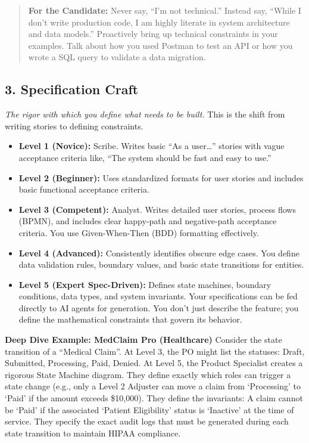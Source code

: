 \begin{quote}
\textbf{For the Candidate:} Never say, ``I'm not technical.'' Instead
say, ``While I don't write production code, I am highly literate in
system architecture and data models.'' Proactively bring up technical
constraints in your examples. Talk about how you used Postman to test an
API or how you wrote a SQL query to validate a data migration.
\end{quote}

\subsection{3. Specification Craft}\label{specification-craft}

\emph{The rigor with which you define what needs to be built.} This is
the shift from writing stories to defining constraints.

\begin{itemize}
\tightlist
\item
  \textbf{Level 1 (Novice):} Scribe. Writes basic ``As a user\ldots{}''
  stories with vague acceptance criteria like, ``The system should be
  fast and easy to use.''
\item
  \textbf{Level 2 (Beginner):} Uses standardized formats for user
  stories and includes basic functional acceptance criteria.
\item
  \textbf{Level 3 (Competent):} Analyst. Writes detailed user stories,
  process flows (BPMN), and includes clear happy-path and negative-path
  acceptance criteria. You use Given-When-Then (BDD) formatting
  effectively.
\item
  \textbf{Level 4 (Advanced):} Consistently identifies obscure edge
  cases. You define data validation rules, boundary values, and basic
  state transitions for entities.
\item
  \textbf{Level 5 (Expert Spec-Driven):} Defines state machines,
  boundary conditions, data types, and system invariants. Your
  specifications can be fed directly to AI agents for generation. You
  don't just describe the feature; you define the mathematical
  constraints that govern its behavior.
\end{itemize}

\textbf{Deep Dive Example: MedClaim Pro (Healthcare)} Consider the state
transition of a ``Medical Claim''. At Level 3, the PO might list the
statuses: Draft, Submitted, Processing, Paid, Denied. At Level 5, the
Product Specialist creates a rigorous State Machine diagram. They define
exactly which roles can trigger a state change (e.g., only a Level 2
Adjuster can move a claim from `Processing' to `Paid' if the amount
exceeds \$10,000). They define the invariants: A claim cannot be `Paid'
if the associated `Patient Eligibility' status is `Inactive' at the time
of service. They specify the exact audit logs that must be generated
during each state transition to maintain HIPAA compliance.

